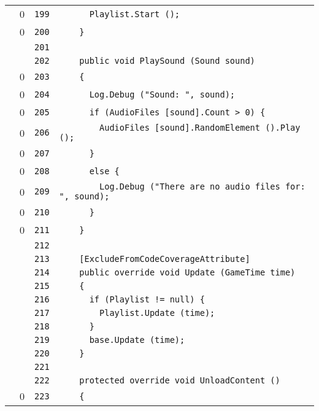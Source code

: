\documentclass[a4paper,10pt]{article}
\begin{document}
\begin{longtable}[l]{lrrl}
\cellcolor{red} & 0 & \verb~199~ & \verb~      Playlist.Start ();~\\
\cellcolor{red} & 0 & \verb~200~ & \verb~    }~\\
\cellcolor{gray} &  & \verb~201~ & \verb~~\\
\cellcolor{gray} &  & \verb~202~ & \verb~    public void PlaySound (Sound sound)~\\
\cellcolor{red} & 0 & \verb~203~ & \verb~    {~\\
\cellcolor{red} & 0 & \verb~204~ & \verb~      Log.Debug ("Sound: ", sound);~\\
\cellcolor{red} & 0 & \verb~205~ & \verb~      if (AudioFiles [sound].Count > 0) {~\\
\cellcolor{red} & 0 & \verb~206~ & \verb~        AudioFiles [sound].RandomElement ().Play ();~\\
\cellcolor{red} & 0 & \verb~207~ & \verb~      }~\\
\cellcolor{red} & 0 & \verb~208~ & \verb~      else {~\\
\cellcolor{red} & 0 & \verb~209~ & \verb~        Log.Debug ("There are no audio files for: ", sound);~\\
\cellcolor{red} & 0 & \verb~210~ & \verb~      }~\\
\cellcolor{red} & 0 & \verb~211~ & \verb~    }~\\
\cellcolor{gray} &  & \verb~212~ & \verb~~\\
\cellcolor{gray} &  & \verb~213~ & \verb~    [ExcludeFromCodeCoverageAttribute]~\\
\cellcolor{gray} &  & \verb~214~ & \verb~    public override void Update (GameTime time)~\\
\cellcolor{gray} &  & \verb~215~ & \verb~    {~\\
\cellcolor{gray} &  & \verb~216~ & \verb~      if (Playlist != null) {~\\
\cellcolor{gray} &  & \verb~217~ & \verb~        Playlist.Update (time);~\\
\cellcolor{gray} &  & \verb~218~ & \verb~      }~\\
\cellcolor{gray} &  & \verb~219~ & \verb~      base.Update (time);~\\
\cellcolor{gray} &  & \verb~220~ & \verb~    }~\\
\cellcolor{gray} &  & \verb~221~ & \verb~~\\
\cellcolor{gray} &  & \verb~222~ & \verb~    protected override void UnloadContent ()~\\
\cellcolor{red} & 0 & \verb~223~ & \verb~    {~\\

\end{longtable}
\end{document}
